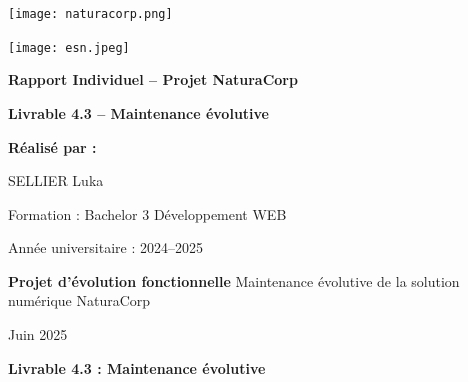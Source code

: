 \documentclass[a4paper,12pt]{report}
\begin{document}
\thispagestyle{empty}
\begin{center}
    \begin{minipage}{0.45\textwidth}
        \centering
        \texttt{[image: naturacorp.png]}
        \vspace{0.3cm}
    \end{minipage}
    \hfill
    \begin{minipage}{0.45\textwidth}
        \centering
        \texttt{[image: esn.jpeg]}
        \vspace{0.3cm}
    \end{minipage}
    \vspace*{0.5cm}
    
    {\Huge\bfseries\color{naturacorpgreen} Rapport Individuel -- Projet NaturaCorp\par}
    \vspace{1.2cm}
    
    {\LARGE\bfseries Livrable 4.3 -- Maintenance évolutive\par}
    \vspace{2cm}
    
    {\Large\bfseries Réalisé par :\par}
    \vspace{0.3cm}
    {\Large SELLIER Luka\par}
    \vspace{0.5cm}
    {\large Formation : Bachelor 3 Développement WEB\par}
    \vspace{0.3cm}
    \vspace{0.3cm}
    {\large Année universitaire : 2024--2025\par}
    \vspace{1.5cm}
    
    \begin{minipage}{0.8\textwidth}
        \centering
        \textbf{Projet d'évolution fonctionnelle}%
        \vspace{0.2cm}
        Maintenance évolutive de la solution numérique NaturaCorp
    \end{minipage}
    \vspace{1.5cm}
    
    {\large Juin 2025\par}
\vspace*{\fill}
\begin{center}
    \textbf{Livrable 4.3 : Maintenance évolutive}
\end{center}
\end{center}
\end{document}
